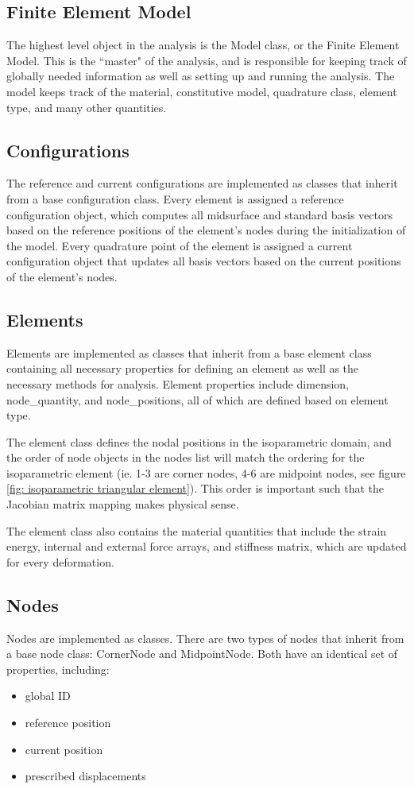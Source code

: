 \documentclass[]{spie}  %
\begin{document}
\subsection{Finite Element Model}
The highest level object in the analysis is the Model class, or the Finite Element Model. This is the ``master" of the analysis, and is responsible for keeping track of globally needed information as well as setting up and running the analysis. The model keeps track of the material, constitutive model, quadrature class, element type, and many other quantities.

\subsection{Configurations}
The reference and current configurations are implemented as classes that inherit from a base configuration class. Every element is assigned a reference configuration object, which computes all midsurface and standard basis vectors based on the reference positions of the element's nodes during the initialization of the model. Every quadrature point of the element is assigned a current configuration object that updates all basis vectors based on the current positions of the element's nodes. 

\subsection{Elements}
Elements are implemented as classes that inherit from a base element class containing all necessary properties for defining an element as well as the necessary methods for analysis. Element properties include dimension, node\_quantity, and node\_positions, all of which are defined based on element type. 

The element class defines the nodal positions in the isoparametric domain, and the order of node objects in the nodes list will match the ordering for the isoparametric element (ie. 1-3 are corner nodes, 4-6 are midpoint nodes, see figure \ref{fig: isoparametric triangular element}). This order is important such that the Jacobian matrix mapping makes physical sense. 

The element class also contains the material quantities that include the strain energy, internal and external force arrays, and stiffness matrix, which are updated for every deformation.

\subsection{Nodes}
Nodes are implemented as classes. There are two types of nodes that inherit from a base node class: CornerNode and MidpointNode. Both have an identical set of properties, including:
\begin{itemize}
	\item global ID
	\item reference position
	\item current position
	\item prescribed displacements
\end{itemize} 
\end{document}
